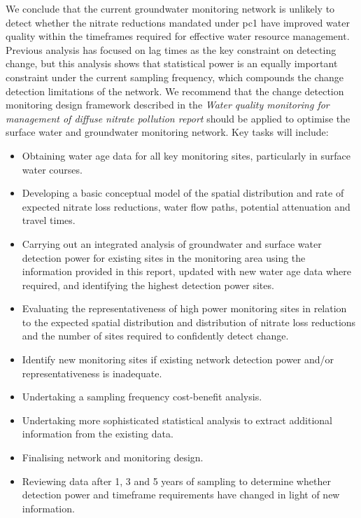 We conclude that the current groundwater monitoring network is unlikely to detect whether the nitrate reductions mandated under \gls{pc1} have improved water quality within the timeframes required for effective water resource management.
Previous analysis has focused on lag times as the key constraint on detecting change, but this analysis shows that statistical power is an equally important constraint under the current sampling frequency, which compounds the change detection limitations of the network.
We recommend that the change detection monitoring design framework described in the \textit{Water quality monitoring for management of diffuse nitrate pollution report} %
should be applied to optimise the surface water and groundwater monitoring network. Key tasks will include:
\begin{itemize}
    \item Obtaining water age data for all key monitoring sites, particularly in surface water courses.
    \item Developing a basic conceptual model of the spatial distribution and rate of expected nitrate loss reductions, water flow paths, potential attenuation and travel times.
    \item Carrying out an integrated analysis of groundwater and surface water detection power for existing sites in the monitoring area using the information provided in this report, updated with new water age data where required, and identifying the highest detection power sites.
    \item Evaluating the representativeness of high power monitoring sites in relation to the expected spatial distribution and distribution of nitrate loss reductions and the number of sites required to confidently detect change.
    \item Identify new monitoring sites if existing network detection power and/or representativeness is inadequate.
    \item Undertaking a sampling frequency cost-benefit analysis.
    \item Undertaking more sophisticated statistical analysis to extract additional information from the existing data.
    \item Finalising network and monitoring design.
    \item Reviewing data after 1, 3 and 5 years of sampling to determine whether detection power and timeframe requirements have changed in light of new information.
\end{itemize}
